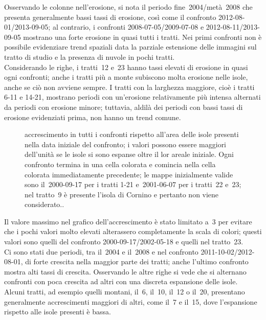 Osservando le colonne nell'erosione, si nota il periodo fine~2004/metà~2008 che presenta generalmente bassi tassi di erosione, così come il confronto 2012-08-01/2013-09-05;
al contrario, i confronti 2008-07-05/2009-07-08 e 2012-08-11/2013-09-05 mostrano una forte erosione in quasi tutti i tratti.
Nei primi confronti non è possibile evidenziare trend spaziali data la parziale estensione delle immagini sul tratto di studio e la presenza di nuvole in pochi tratti.
\\
Considerando le righe, i tratti~12 e~23 hanno tassi elevati di erosione in quasi ogni confronti; anche i tratti più a monte subiscono molta erosione nelle isole, anche se ciò non avviene sempre.
I tratti con la larghezza maggiore, cioè i tratti 6-11 e 14-21, mostrano periodi con un'erosione relativamente più intensa alternati da periodi con erosione minore; tuttavia, aldilà dei periodi con bassi tassi di erosione evidenziati prima, non hanno un trend comune.
%
\begin{figure}
	\centering
	
	\caption[accrescimento in tutti i confronti rispetto all'area delle isole presenti inizialmente]{accrescimento in tutti i confronti rispetto all'area delle isole presenti nella data iniziale del confronto; i valori possono essere maggiori dell'unità se le isole si sono espanse oltre il lor areale iniziale.
	Ogni confronto termina in una cella colorata e comincia nella cella colorata immediatamente precedente; le mappe inizialmente valide sono il~2000-09-17 per i tratti 1-21 e~2001-06-07 per i tratti~22 e~23; nel tratto~9 è presente l'isola di Cornino e pertanto non viene considerato..}
	\label{graph:accrescimento-matrix}
\end{figure}
%

Il valore massimo nel grafico dell'accrescimento è stato limitato a~\num{3} per evitare che i pochi valori molto elevati alterassero completamente la scala di colori; questi valori sono quelli del confronto 2000-09-17/2002-05-18 e quelli nel tratto~23.
\\
Ci sono stati due periodi, tra il~2004 e il~2008 e nel confronto 2011-10-02/2012-08-01, di forte crescita nella maggior parte dei tratti; anche l'ultimo confronto mostra alti tassi di crescita.
Osservando le altre righe si vede che si alternano confronti con poca crescita ad altri con una discreta espansione delle isole.
\\
Alcuni tratti, ad esempio quelli montani, il~6, il~10, il~12 o il~20, presentano generalmente accrescimenti maggiori di altri, come il~7 e il~15, dove l'espansione rispetto alle isole presenti è bassa.


